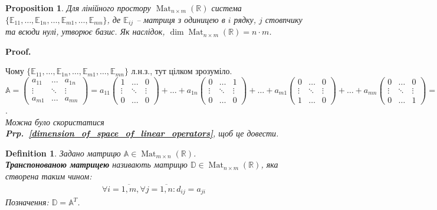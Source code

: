 \documentclass[a4paper, 10pt]{article}
\makeatletter
\theoremstyle{theoremdd}
\newtheorem{definition}[theorem]{Definition}
\newtheorem{proposition}[theorem]{Proposition}
\newcommand\prpref[1]{\textbf{Prp.~\ref{#1}}}
\DeclareMathOperator{\Mat}{Mat}
\renewenvironment{proof}[1][Proof.\\]{\par
\pushQED{\hfill \qed}%
\normalfont \topsep6\p@\@plus6\p@\relax
\trivlist
\item\relax
{\bfseries
#1\@addpunct{.}}\hspace\labelsep\ignorespaces
}{%
\popQED\endtrivlist\@endpefalse
}
\makeatother
\begin{document}
	\begin{proposition}
	Для лінійного простору $\Mat_{n \times m}(\mathbb{R})$ система $\{\mathbb{E}_{11},\dots, \mathbb{E}_{1n},\dots, \mathbb{E}_{m1}, \dots, \mathbb{E}_{mn}\}$, де $\mathbb{E}_{ij}$ -- матриця з одиницею в $i$ рядку, $j$ стовпчику та всюди нулі, утворює базис. Як наслідок, $\dim \Mat_{n \times m}(\mathbb{R}) = n \cdot m$.
	\end{proposition}
	
	\begin{proof}
	Чому $\{\mathbb{E}_{11},\dots, \mathbb{E}_{1n},\dots, \mathbb{E}_{m1}, \dots, \mathbb{E}_{mn}\}$ л.н.з., тут цілком зрозуміло.\\
	$\mathbb{A} = \begin{pmatrix}
	a_{11} & \dots & a_{1n} \\
	\vdots & \ddots & \vdots \\
	a_{m1} & \dots & a_{mn} 
	\end{pmatrix} = a_{11}\begin{pmatrix}
	1 & \dots & 0 \\
	\vdots & \ddots & \vdots \\
	0 & \dots & 0 
	\end{pmatrix} + \dots + a_{1n}\begin{pmatrix}
	0 & \dots & 1 \\
	\vdots & \ddots & \vdots \\
	0 & \dots & 0 
	\end{pmatrix} + \dots + a_{m1}\begin{pmatrix}
	0 & \dots & 0 \\
	\vdots & \ddots & \vdots \\
	1 & \dots & 0 
	\end{pmatrix} + \dots + a_{mn}\begin{pmatrix}
	0 & \dots & 0 \\
	\vdots & \ddots & \vdots \\
	0 & \dots & 1 
	\end{pmatrix} = a_{11}\mathbb{E}_{11} + \dots + a_{1n}\mathbb{E}_{1n} + \dots + a_{m1}\mathbb{E}_{m1} + \dots + a_{mn}\mathbb{E}_{mn}$.
	\bigskip \\
	\textit{Можна було скористатися \prpref{dimension_of_space_of_linear_operators}, щоб це довести.}
	\end{proof}
	
	\begin{definition}
	Задано матрицю $\mathbb{A} \in \Mat_{m \times n}(\mathbb{R})$.\\
	\textbf{Транспонованою матрицею} називають матрицю $\mathbb{D} \in \Mat_{n \times m}(\mathbb{R})$, яка створена таким чином:
	\begin{align*}
	\forall i = \overline{1,m}, \forall j = \overline{1,n}: d_{ij} = a_{ji}
	\end{align*}
	Позначення: $\mathbb{D} = \mathbb{A}^T$.
	\end{definition}
	
\end{document}

